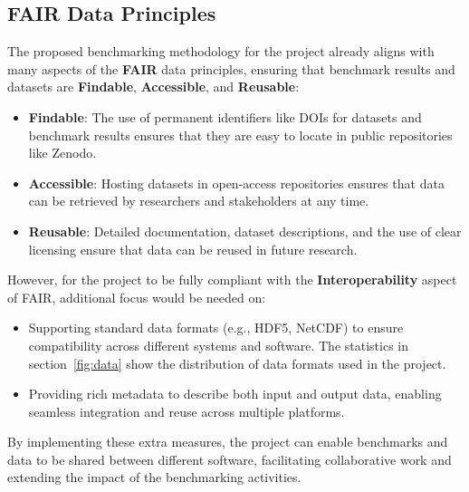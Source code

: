 \subsection{FAIR Data Principles}
\label{sec:fair-data-principles}

The proposed benchmarking methodology for the \exama project already aligns with many aspects of the \textbf{FAIR} data principles, ensuring that benchmark results and datasets are \textbf{Findable}, \textbf{Accessible}, and \textbf{Reusable}:
\begin{itemize}
    \item \textbf{Findable}: The use of permanent identifiers like DOIs for datasets and benchmark results ensures that they are easy to locate in public repositories like Zenodo.
    \item \textbf{Accessible}: Hosting datasets in open-access repositories ensures that data can be retrieved by researchers and stakeholders at any time.
    \item \textbf{Reusable}: Detailed documentation, dataset descriptions, and the use of clear licensing ensure that data can be reused in future research.
\end{itemize}

However, for the \exama project to be fully compliant with the \textbf{Interoperability} aspect of FAIR, additional focus would be needed on:
\begin{itemize}
    \item Supporting standard data formats (e.g., HDF5, NetCDF) to ensure compatibility across different systems and software. The statistics in section~\ref{fig:data} show the distribution of data formats used in the project.
    \item Providing rich metadata to describe both input and output data, enabling seamless integration and reuse across multiple platforms.
\end{itemize}

By implementing these extra measures, the \exama project can enable benchmarks and data to be shared between different software, facilitating collaborative work and extending the impact of the benchmarking activities.